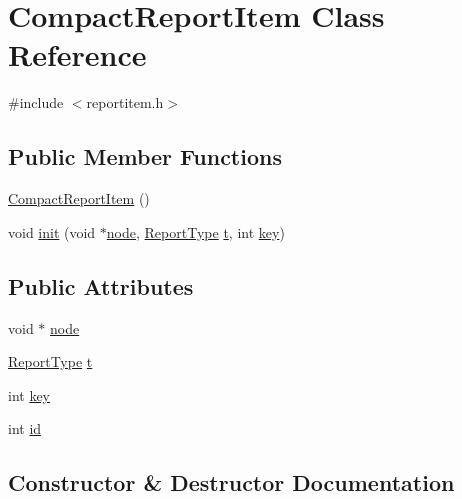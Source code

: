 \hypertarget{classCompactReportItem}{}\section{Compact\+Report\+Item Class Reference}
\label{classCompactReportItem}


{\ttfamily \#include $<$reportitem.\+h$>$}

\subsection*{Public Member Functions}
\begin{DoxyCompactItemize}
\item 
\hyperlink{classCompactReportItem_a23a22b952ad261a529d8224e9d73347d}{Compact\+Report\+Item} ()
\item 
void \hyperlink{classCompactReportItem_a0504a6f22fd588f4030c0b5386afc5c5}{init} (void $\ast$\hyperlink{classCompactReportItem_acedc7035f6c4fd7f2a1c141ee05a6d52}{node}, \hyperlink{reportitem_8h_ae4f179a72db5cca021a37ec4c6fe4c68}{Report\+Type} \hyperlink{classCompactReportItem_a6811374fc37b9b9e9ec44338752d9c76}{t}, int \hyperlink{classCompactReportItem_a38caa24aceb0050eec02dd439793df05}{key})
\end{DoxyCompactItemize}
\subsection*{Public Attributes}
\begin{DoxyCompactItemize}
\item 
void $\ast$ \hyperlink{classCompactReportItem_acedc7035f6c4fd7f2a1c141ee05a6d52}{node}
\item 
\hyperlink{reportitem_8h_ae4f179a72db5cca021a37ec4c6fe4c68}{Report\+Type} \hyperlink{classCompactReportItem_a6811374fc37b9b9e9ec44338752d9c76}{t}
\item 
int \hyperlink{classCompactReportItem_a38caa24aceb0050eec02dd439793df05}{key}
\item 
int \hyperlink{classCompactReportItem_a77f72e05167dd5b5b275fcaf1c413d0b}{id}
\end{DoxyCompactItemize}


\subsection{Constructor \& Destructor Documentation}
\mbox{\label{classCompactReportItem_a23a22b952ad261a529d8224e9d73347d}} 
